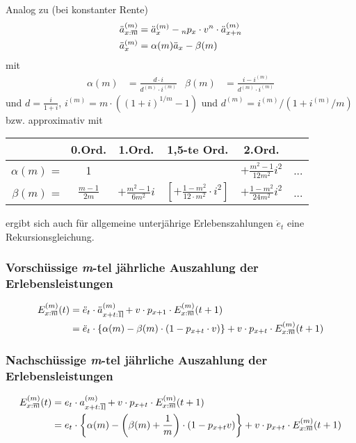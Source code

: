 \documentclass[a4paper,10pt]{article}
\makeatletter
\newcommand{\xn}{{\act[x]{n}}}
\DeclareRobustCommand{\act}[2][]{%
\def\arraystretch{0}%
\setlength\arraycolsep{0.5pt}%
\setlength\arrayrulewidth{0.5pt}%
\setbox0=\hbox{$\scriptstyle#1\ifx#1\empty{asdf}\else:\fi#2$}%
\begin{array}[b]{*2{@{}>{\scriptstyle}c}|}
\cline{2-2}%
\rule[1.25pt]{0pt}{\ht0}%
#1\ifx#1\empty\else:\fi & #2%
\end{array}%
}
\makeatother
\begin{document}
Analog zu (bei konstanter Rente)
\begin{align*}
 \ddot{a}^{(m)}_\xn &= \ddot{a}_x^{(m)} - {}_np_x \cdot v^n \cdot \ddot{a}_{x+n}^{(m)}\\
 \ddot{a}_x^{(m)} &= \alpha(m) \ddot{a}_x - \beta(m)
\end{align*}
mit 
\begin{align*}
 \alpha(m)&= \frac{d \cdot i}{d^{(m)} \cdot i^{(m)}} & \beta(m) &= \frac{i-i^{(m)}}{d^{(m)} \cdot i^{(m)}}
\end{align*}
und $d = \frac{i}{1+i}$, $i^{(m)} = m \cdot \left((1+i)^{1/m} -1\right)$ und $d^{(m)} = i^{(m)} / \left(1+i^{(m)}/m\right)$ bzw. approximativ mit
\begin{center}
\begin{tabular}{rccccc}
& 0.Ord. & 1.Ord. & 1,5-te Ord. & 2.Ord. & \\\hline
$\alpha(m)$ = & 1 &  & & $+\frac{m^2-1}{12 m^2} i^2$ & ...\\
$\beta(m)$ = & $\frac{m-1}{2m}$ & $+ \frac{m^2-1}{6 m^2}i$ & $\left[+ \frac{1-m^2}{12\cdot m^2}\cdot i^2\right]$ &$+ \frac{1-m^2}{24 m^2}i^2$ & ...\\[0.3em]\hline 
\end{tabular}
\end{center}

ergibt sich auch für allgemeine unterjährige Erlebenszahlungen $\ddot{e}_t$ eine Rekursionsgleichung.

\subsubsection{Vorschüssige \textit{m}-tel jährliche Auszahlung der Erlebensleistungen}


\begin{align*}
E^{(m)}_\xn(t) &= \ddot{e}_t \cdot \ddot{a}_{\act[x+t]{1}}^{(m)} + v \cdot p_{x+1} \cdot E^{(m)}_\xn(t+1)\\
  &= \ddot{e}_t \cdot \left\{\alpha(m)  - \beta(m) \cdot \left(1-p_{x+t} \cdot v\right)\right\} + v\cdot p_{x+t} \cdot E^{(m)}_\xn(t+1)
\end{align*}


\subsubsection{Nachschüssige \textit{m}-tel jährliche Auszahlung der Erlebensleistungen}

\begin{align*}
E^{(m)}_\xn(t) &= e_t \cdot a_{\act[x+t]{1}}^{(m)} + v \cdot p_{x+t} \cdot E^{(m)}_\xn(t+1)\\
   &= e_t\cdot\left\{\alpha(m) - \left(\beta(m)+\frac1m\right)\cdot\left(1-p_{x+t} v\right)\right\} + v\cdot p_{x+t} \cdot E^{(m)}_\xn(t+1)
\end{align*}
\end{document}
